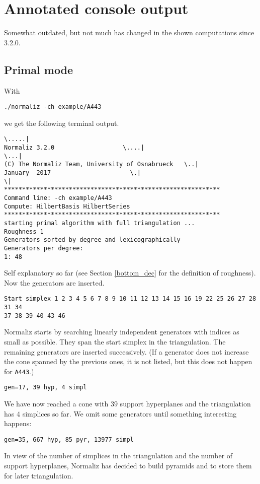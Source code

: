 \documentclass[12pt,a4paper]{scrartcl}
\theoremstyle{definition}
\begin{document}
\section{Annotated console output}\label{Console}

Somewhat outdated, but not much has changed in the shown computations since 3.2.0.

\subsection{Primal mode}

With
\begin{Verbatim}
./normaliz -ch example/A443
\end{Verbatim}
we get the following terminal output.

\begin{Verbatim}
\.....|
Normaliz 3.2.0                   \....|
\...|
(C) The Normaliz Team, University of Osnabrueck   \..|
January  2017                      \.|
\|
************************************************************
Command line: -ch example/A443 
Compute: HilbertBasis HilbertSeries 
************************************************************
starting primal algorithm with full triangulation ...
Roughness 1
Generators sorted by degree and lexicographically
Generators per degree:
1: 48 
\end{Verbatim}
Self explanatory so far (see Section \ref{bottom_dec} for the definition of roughness). Now the generators are inserted.
\begin{Verbatim}
Start simplex 1 2 3 4 5 6 7 8 9 10 11 12 13 14 15 16 19 22 25 26 27 28 31 34 
37 38 39 40 43 46 
\end{Verbatim}
Normaliz starts by searching linearly independent generators with indices as small as possible. They span the start simplex in the triangulation. The remaining generators are inserted successively. (If a generator does not increase the cone spanned by the previous ones, it is not listed, but this does not happen for \verb|A443|.)
\begin{Verbatim}
gen=17, 39 hyp, 4 simpl
\end{Verbatim}
We have now reached a cone with $39$ support hyperplanes and the triangulation has $4$  simplices so far. We omit some generators until something interesting happens:
\begin{Verbatim}
gen=35, 667 hyp, 85 pyr, 13977 simpl
\end{Verbatim}
In view of the number of simplices in the triangulation and the number of support hyperplanes, Normaliz has decided to build pyramids and to store them for later triangulation.
\end{document}
